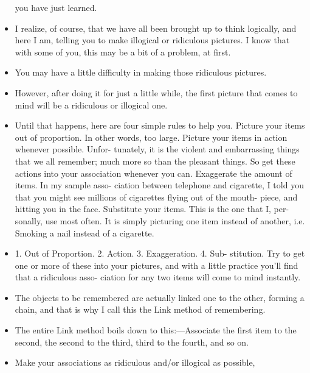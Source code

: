 \begin{itemize}
            you have just learned.
            \item I realize, of course, that we have all been brought up to
            think logically, and here I am, telling you to make illogical
            or ridiculous pictures. I know that with some of you, this
            may be a bit of a problem, at first.
            \item You may have a little
            difficulty in making those ridiculous pictures.
            \item However,
            after doing it for just a little while, the first picture that
            comes to mind will be a ridiculous or illogical one.
            \item Until
            that happens, here are four simple rules to help you.
                \subitem Picture your items out of proportion. In other words,
            too large.
                \subitem Picture your items in action whenever possible. Unfor-
            tunately, it is the violent and embarrassing things that we
            all remember; much more so than the pleasant things. So get these actions into
            your association whenever you can.
                \subitem Exaggerate the amount of items. In my sample asso-
            ciation between telephone and cigarette, I told you that you
            might see millions of cigarettes flying out of the mouth-
            piece, and hitting you in the face.
                \subitem Substitute your items. This is the one that I, per-
            sonally, use most often. It is simply picturing one item
            instead of another, i.e. Smoking a nail instead of a cigarette.
            \item 1. Out of Proportion. 2. Action. 3. Exaggeration. 4. Sub-
            stitution. Try to get one or more of these into your pictures,
            and with a little practice you'll find that a ridiculous asso-
            ciation for any two items will come to mind instantly.
            \item The
            objects to be remembered are actually linked one to the
            other, forming a chain, and that is why I call this the Link
            method of remembering.
            \item The entire Link method boils
            down to this:—Associate the first item to the second, the
            second to the third, third to the fourth, and so on.
            \item Make
            your associations as ridiculous and/or illogical as possible,

\end{itemize}
